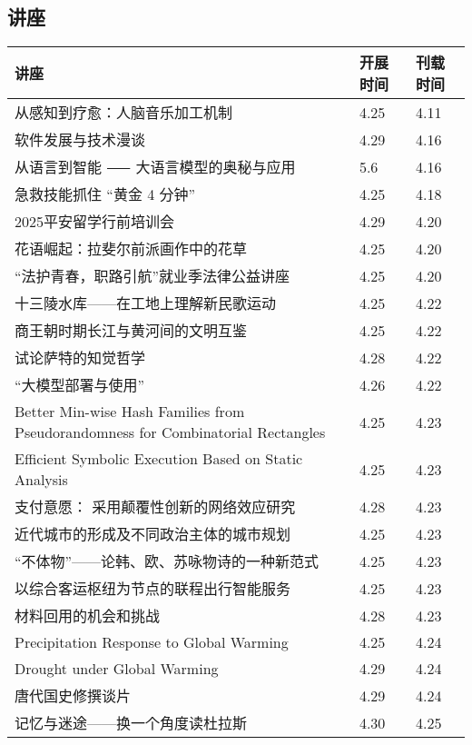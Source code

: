 \documentclass[letterpaper, 12pt]{article}
\begin{document}
\begin{multicols}{2}
\pagebreak

\section{讲座}
\begin{tabular}{|>{\centering\arraybackslash}m{}|m{}|m{}|}
    \hline
    讲座 & 开展时间 & 刊载时间\\
    \hline\hline
    从感知到疗愈：人脑音乐加工机制 & 4.25 & 4.11\\\hline
    软件发展与技术漫谈 & 4.29 & 4.16\\\hline
    从语言到智能 ⸺ 大语言模型的奥秘与应用 & 5.6 & 4.16\\\hline
    急救技能抓住 “黄金 4 分钟” & 4.25 & 4.18\\\hline
    2025平安留学行前培训会 & 4.29 & 4.20\\\hline
    花语崛起：拉斐尔前派画作中的花草 & 4.25 & 4.20\\\hline
    “法护青春，职路引航”就业季法律公益讲座 & 4.25 & 4.20\\\hline
    十三陵水库——在工地上理解新民歌运动 & 4.25 & 4.22\\\hline
    商王朝时期长江与黄河间的文明互鉴 & 4.25 & 4.22\\\hline
    试论萨特的知觉哲学 & 4.28 & 4.22\\\hline
    “大模型部署与使用” & 4.26 & 4.22\\\hline
    Better Min-wise Hash Families from Pseudorandomness for Combinatorial Rectangles & 4.25 & 4.23\\\hline
    Efficient Symbolic Execution Based on Static Analysis & 4.25 & 4.23\\\hline
    支付意愿： 采用颠覆性创新的网络效应研究 & 4.28 & 4.23\\\hline
    近代城市的形成及不同政治主体的城市规划 & 4.25 & 4.23\\\hline
    “不体物”——论韩、欧、苏咏物诗的一种新范式 & 4.25 & 4.23\\\hline
    以综合客运枢纽为节点的联程出行智能服务 & 4.25 & 4.23\\\hline
    材料回用的机会和挑战 & 4.28 & 4.23\\\hline
    Precipitation Response to Global Warming & 4.25 & 4.24\\\hline
    Drought under Global Warming & 4.29 & 4.24\\\hline
    唐代国史修撰谈片 & 4.29 & 4.24\\\hline
    记忆与迷途——换一个角度读杜拉斯 & 4.30 & 4.25 \\\hline
\end{tabular}

\end{multicols}
\end{document}

